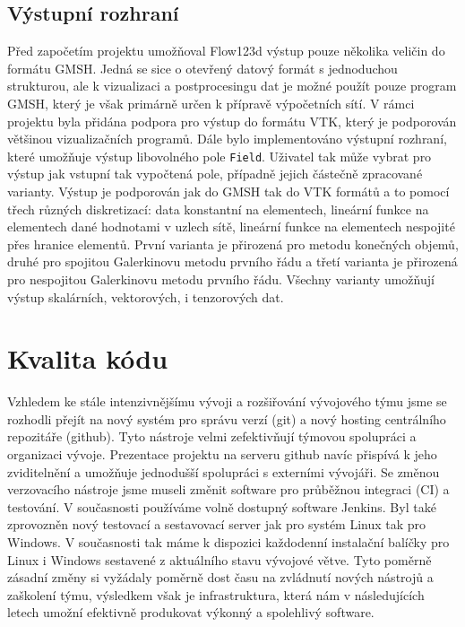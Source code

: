 \documentclass[11pt]{report}
\begin{document}
\subsection{Výstupní rozhraní}
Před započetím projektu umožňoval Flow123d výstup pouze několika veličin do 
formátu GMSH. Jedná se sice o otevřený datový formát s jednoduchou strukturou, 
ale k vizualizaci a postprocesingu dat je možné použít pouze program GMSH, 
který je však primárně určen k přípravě výpočetních sítí. V rámci projektu byla 
přidána podpora pro výstup do formátu VTK, který je podporován většinou 
vizualizačních programů. Dále bylo implementováno výstupní rozhraní, které 
umožňuje výstup libovolného pole \verb'Field'. Uživatel tak může vybrat pro 
výstup jak vstupní tak vypočtená pole, případně jejich částečně zpracované 
varianty. Výstup je podporován jak do GMSH tak do VTK formátů a to pomocí třech 
různých diskretizací: data konstantní na elementech, lineární funkce na 
elementech dané hodnotami v uzlech sítě, lineární funkce na elementech 
nespojité přes hranice elementů. První varianta je přirozená pro metodu 
konečných objemů, druhé pro spojitou Galerkinovu  metodu prvního řádu a 
třetí varianta je přirozená pro nespojitou Galerkinovu metodu prvního 
řádu. Všechny varianty umožňují výstup skalárních, vektorových, i tenzorových 
dat.

\section{Kvalita kódu}

Vzhledem ke stále intenzivnějšímu vývoji a rozšiřování vývojového týmu jsme se 
rozhodli přejít na nový systém pro správu verzí (git) a nový hosting centrálního 
repozitáře (github). Tyto nástroje velmi zefektivňují týmovou spolupráci a 
organizaci vývoje. Prezentace projektu na serveru github navíc přispívá k jeho 
zviditelnění a umožňuje jednodušší spolupráci s externími vývojáři. Se změnou 
verzovacího nástroje jsme museli změnit software pro průběžnou integraci (CI) a 
testování. V současnosti používáme volně dostupný software Jenkins. Byl také 
zprovozněn nový testovací a sestavovací server jak pro systém Linux tak pro 
Windows. V současnosti tak máme k dispozici každodenní instalační balíčky pro 
Linux i Windows sestavené z aktuálního stavu vývojové větve.  Tyto poměrně 
zásadní změny si vyžádaly poměrně dost času na zvládnutí nových nástrojů a 
zaškolení týmu, výsledkem však je  infrastruktura, která nám v následujících 
letech umožní efektivně produkovat výkonný a spolehlivý software.
\end{document}
